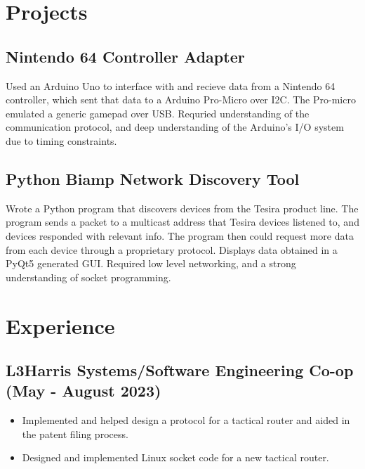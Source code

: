 \documentclass{article}
\begin{document}
\section{Projects}
    \subsection{Nintendo 64 Controller Adapter}
    Used an Arduino Uno to interface with and recieve data from a Nintendo 64
    controller, which sent that data to a Arduino Pro-Micro over I2C. The
    Pro-micro emulated a generic gamepad over USB. Requried understanding of the
    communication protocol, and deep understanding of the Arduino's I/O system due 
    to timing constraints.

    \subsection{Python Biamp Network Discovery Tool}
    Wrote a Python program that discovers devices from the Tesira
    product line. The program sends a packet to a multicast address that Tesira
    devices listened to, and devices responded with relevant info. The program
    then could request more data from each device through a proprietary
    protocol. Displays data obtained in a PyQt5 generated GUI. Required low level 
    networking, and a strong understanding of socket programming.


\section{Experience}

    \subsection{L3Harris Systems/Software Engineering Co-op \hfill (May -
    August 2023)}
        \begin{itemize}[noitemsep]
            \item Implemented and helped design a protocol for a tactical router
                and aided in the patent filing process.
            \item Designed and implemented Linux socket code for a new tactical
                router.
        \end{itemize}
\end{document}
